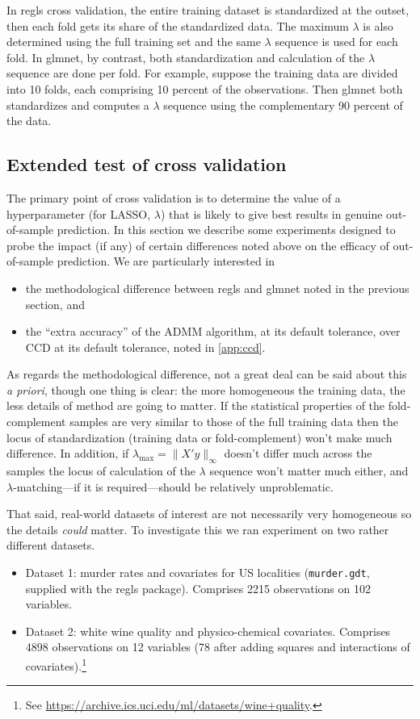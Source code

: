 \documentclass{article}
\begin{document}
In \textsf{regls} cross validation, the entire training dataset is
standardized at the outset, then each fold gets its share of the
standardized data. The maximum $\lambda$ is also determined using the
full training set and the same $\lambda$ sequence is used for each
fold. In \textsf{glmnet}, by contrast, both standardization and
calculation of the $\lambda$ sequence are done per fold. For example,
suppose the training data are divided into 10 folds, each comprising
10 percent of the observations. Then \textsf{glmnet} both standardizes
and computes a $\lambda$ sequence using the complementary 90 percent
of the data.

\subsection{Extended test of cross validation}

The primary point of cross validation is to determine the value of a
hyperparameter (for LASSO, $\lambda$) that is likely to give best
results in genuine out-of-sample prediction. In this section we
describe some experiments designed to probe the impact (if any) of
certain differences noted above on the efficacy of out-of-sample
prediction. We are particularly interested in
\begin{itemize}
\item the methodological difference between \textsf{regls} and
  \textsf{glmnet} noted in the previous section, and
\item the ``extra accuracy'' of the ADMM algorithm, at its default
  tolerance, over CCD at its default tolerance, noted in
  \ref{app:ccd}.
\end{itemize}

As regards the methodological difference, not a great deal can be said
about this \textit{a priori}, though one thing is clear: the more
homogeneous the training data, the less details of method are going to
matter. If the statistical properties of the fold-complement samples
are very similar to those of the full training data then the locus of
standardization (training data or fold-complement) won't make much
difference. In addition, if $\lambda_{\max} = \|X'y\|_{\infty}$
doesn't differ much across the samples the locus of calculation of the
$\lambda$ sequence won't matter much either, and
$\lambda$-matching---if it is required---should be relatively
unproblematic.

That said, real-world datasets of interest are not necessarily very
homogeneous so the details \textit{could} matter. To investigate this
we ran experiment on two rather different datasets.
\begin{itemize}
\item Dataset 1: murder rates and covariates for US localities
  (\texttt{murder.gdt}, supplied with the \textsf{regls} package).
  Comprises 2215 observations on 102 variables.
\item Dataset 2: white wine quality and physico-chemical covariates.
  Comprises 4898 observations on 12 variables (78 after adding squares
  and interactions of covariates).\footnote{See
    \url{https://archive.ics.uci.edu/ml/datasets/wine+quality}.}
\end{itemize}
\end{document}
